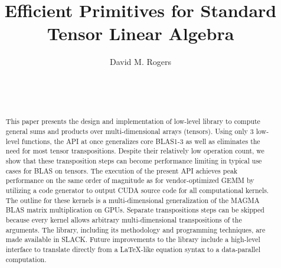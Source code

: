 \documentclass{sigplanconf}
\begin{document}







\title{ Efficient Primitives for Standard Tensor Linear Algebra}
\author{
\alignauthor David M. Rogers\\
    \\
    \\
    \\
}

\maketitle

\begin{abstract}
  This paper presents the design and implementation of low-level
library to compute general sums and products over multi-dimensional arrays (tensors).
Using only 3 low-level functions, the API at once generalizes
core BLAS1-3 as well as eliminates the need for most tensor transpositions.
Despite their relatively low operation count, we show that these transposition steps
can become performance limiting in typical use cases for BLAS on tensors.
The execution of the present API achieves peak performance on the same
order of magnitude as for vendor-optimized GEMM
by utilizing a code generator to output CUDA source code for all computational kernels.
The outline for these kernels is a multi-dimensional generalization
of the MAGMA BLAS matrix multiplication on GPUs.  Separate
transpositions steps can be skipped because every kernel allows arbitrary
multi-dimensional transpositions of the arguments.
The library, including its methodology and programming techniques, are
made available in SLACK.  Future improvements to the library include
a high-level interface to translate directly from a \LaTeX{}-like equation
syntax to a data-parallel computation.
\end{abstract}
\end{document}
